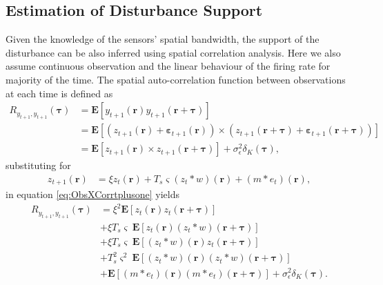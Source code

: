 \documentclass[]{article}
\begin{document}
\subsection*{Estimation of Disturbance Support}
Given the knowledge of the sensors' spatial bandwidth, the support of the disturbance can be also inferred using spatial correlation analysis. Here we also assume continuous observation and the linear behaviour of the firing rate for majority of the time. The spatial auto-correlation function between observations at each time  is defined as 
\begin{align}
	R_{y_{t+1},y_{t+1}}(\boldsymbol{\tau}) &= \mathbf{E}\left[ y_{t+1}\left(\mathbf{r}\right) y_{t+1}\left(\mathbf{r}+\boldsymbol{\tau}\right) \right] \nonumber \\
	&= \mathbf{E}\left[\left(z_{t+1}\left(\mathbf r\right)  + \boldsymbol{\varepsilon}_{t+1}\left(\mathbf{r}\right) \right) \times \left(z_{t+1}\left(\mathbf{r}+\boldsymbol{\tau}\right)+ \boldsymbol{\varepsilon}_{t+1}\left(\mathbf{r}+\boldsymbol{\tau}\right)\right) \right] \nonumber \\
 &= \mathbf{E}\left[z_{t+1}\left(\mathbf r\right)  \times z_{t+1}\left(\mathbf{r}+\boldsymbol{\tau}\right) \right]+\sigma_{\epsilon}^2\delta_{K}\left(\boldsymbol\tau\right),\label{eq:ObsXCorrtplusone}
\end{align}
substituting for
\begin{align}
z_{t+1}\left(\mathbf r\right)&=\xi z_{t}\left(\mathbf r\right)+T_s\varsigma\left(z_t \ast w\right)\left(\mathbf r\right)+\left(m\ast e_t\right)\left(\mathbf r\right),\label{eq:zvariable}
\end{align}
in equation \ref{eq:ObsXCorrtplusone} yields
\begin{align}
	R_{y_{t+1},y_{t+1}}(\boldsymbol{\tau}) &=  \xi^2\mathbf{E}\left[ z_t\left(\mathbf r\right)z_t\left(\mathbf r+\boldsymbol \tau\right)\right] \nonumber \\
						&+\xi T_s\varsigma \ \mathbf{E}\left[z_t\left(\mathbf r\right)\left(z_t \ast w\right)\left(\mathbf r+\boldsymbol\tau\right)\right]\nonumber \\
						&+\xi T_s\varsigma \ \mathbf{E}\left[\left(z_t \ast w\right)\left(\mathbf r\right)z_t\left(\mathbf r+\boldsymbol\tau\right)\right]\nonumber \\
						&+T_s^2\varsigma^2 \ \mathbf{E}\left[\left(z_t \ast w\right)\left(\mathbf r\right)\left(z_t \ast w\right)\left(\mathbf r+\boldsymbol\tau\right)\right]\nonumber \\
						&+\mathbf{E}\left[\left(m \ast e_t\right)\left(\mathbf r\right)\left(m \ast e_t\right)\left(\mathbf r+\boldsymbol\tau\right)\right]+\sigma_{\epsilon}^2\delta_{K}\left(\boldsymbol\tau\right).\label{eq:AutocorrExpansion}
\end{align}
\end{document}
